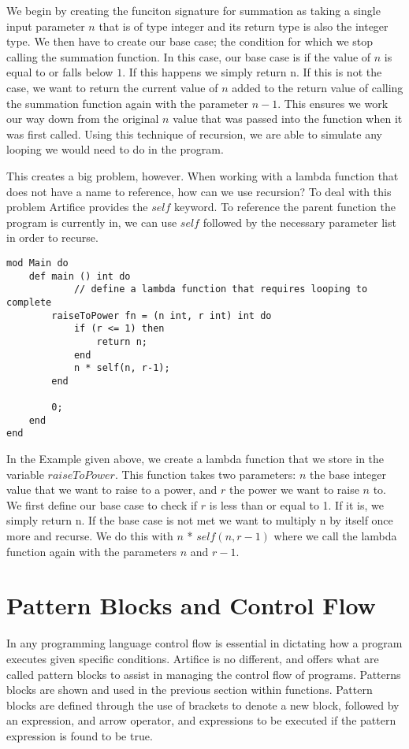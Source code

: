 \documentclass{article}
\begin{document}
We begin by creating the funciton signature for summation as taking a single input parameter $n$ that is of type integer and its return type is also the integer type.
We then have to create our base case; the condition for which we stop calling the summation function. In this case, our base case is if the value of $n$ is equal to
or falls below $1$. If this happens we simply return n. If this is not the case, we want to return the current value of $n$ added to the return value of calling the
summation function again with the parameter $n-1$. This ensures we work our way down from the original $n$ value that was passed into the function when it was first
called. Using this technique of recursion, we are able to simulate any looping we would need to do in the program.

This creates a big problem, however. When working with a lambda function that does not have a name to reference, how can we use recursion? To deal with this problem
Artifice provides the $self$ keyword. To reference the parent function the program is currently in, we can use $self$ followed by the necessary parameter list in order
to recurse.

\begin{lstlisting}
mod Main do
	def main () int do
			// define a lambda function that requires looping to complete
		raiseToPower fn = (n int, r int) int do
			if (r <= 1) then
				return n;
			end
			n * self(n, r-1);
		end

		0;
	end
end
\end{lstlisting}

In the Example given above, we create a lambda function that we store in the variable $raiseToPower$. This function takes two parameters: $n$ the base integer value
that we want to raise to a power, and $r$ the power we want to raise $n$ to. We first define our base case to check if $r$ is less than or equal to 1. If it is,
we simply return n. If the base case is not met we want to multiply n by itself once more and recurse. We do this with $n$ * $self(n,r-1)$ where we call the
lambda function again with the parameters $n$ and $r-1$.


\section{Pattern Blocks and Control Flow}

In any programming language control flow is essential in dictating how a program executes given specific conditions. Artifice is no different, and offers what are called
pattern blocks to assist in managing the control flow of programs. Patterns blocks are shown and used in the previous section within functions. Pattern blocks are defined
through the use of brackets to denote a new block, followed by an expression, and arrow operator, and expressions to be executed if the pattern expression is found to be true.
\end{document}
